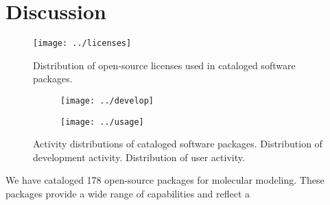 \section{Discussion}

\begin{figure}
\centering 
\texttt{[image: ../licenses]}
\caption{\label{licenses} Distribution of open-source licenses used in cataloged software packages.}
\end{figure}

\begin{figure*}
\centering
\begin{subfigure}[t]{.4\linewidth}
\centering \label{develop}
\texttt{[image: ../develop]}
\end{subfigure}
\hfill
\begin{subfigure}[t]{.4\linewidth}
\centering \label{usage}
\texttt{[image: ../usage]}
\end{subfigure}
\caption{\label{pies} Activity distributions of cataloged software packages.
 Distribution of development activity.  Distribution of user activity.
}
\end{figure*}

We have cataloged 178 open-source packages for molecular modeling.  These packages provide a wide range of capabilities and reflect a